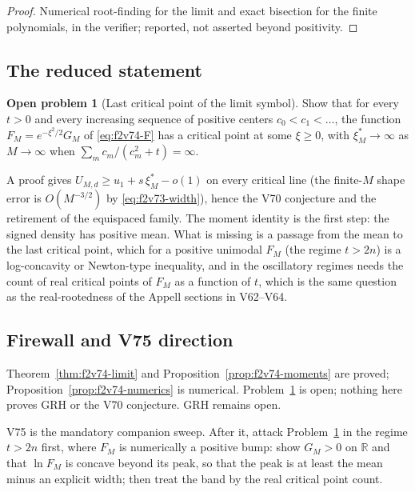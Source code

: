 \documentclass[11pt]{article}
\theoremstyle{definition}
\newtheorem{problem}[theorem]{Open problem}
\theoremstyle{remark}
\begin{document}
\begin{proof}
Numerical root-finding for the limit and exact bisection for the finite
polynomials, in the verifier; reported, not asserted beyond positivity.
\end{proof}

\subsection{The reduced statement}

\begin{problem}[Last critical point of the limit symbol]
\label{prob:f2v74-last}
Show that for every \(t>0\) and every increasing sequence of positive
centers \(c_0<c_1<\dots\), the function
\(F_M=e^{-\xi^2/2}G_M\) of \eqref{eq:f2v74-F} has a critical point at
some \(\xi\ge0\), with \(\xi^*_M\to\infty\) as \(M\to\infty\) when
\(\sum_m c_m/(c_m^2+t)=\infty\).
\end{problem}

A proof gives \(U_{M,d}\ge u_1+s\,\xi^*_M-o(1)\) on every critical line
(the finite-\(M\) shape error is \(O(M^{-3/2})\) by
\eqref{eq:f2v73-width}), hence the V70 conjecture and the retirement of
the equispaced family.  The moment identity is the first step: the
signed density has positive mean.  What is missing is a passage from
the mean to the last critical point, which for a positive unimodal
\(F_M\) (the regime \(t>2n\)) is a log-concavity or Newton-type
inequality, and in the oscillatory regimes needs the count of real
critical points of \(F_M\) as a function of \(t\), which is the same
question as the real-rootedness of the Appell sections in V62--V64.

\subsection*{Firewall and V75 direction}
\label{fire:f2v74}
Theorem~\ref{thm:f2v74-limit} and Proposition~\ref{prop:f2v74-moments}
are proved; Proposition~\ref{prop:f2v74-numerics} is numerical.
Problem~\ref{prob:f2v74-last} is open; nothing here proves GRH or the
V70 conjecture.  GRH remains open.

V75 is the mandatory companion sweep.  After it, attack
Problem~\ref{prob:f2v74-last} in the regime \(t>2n\) first, where
\(F_M\) is numerically a positive bump: show \(G_M>0\) on \(\mathbb R\)
and that \(\ln F_M\) is concave beyond its peak, so that the peak is at
least the mean minus an explicit width; then treat the band by the real
critical point count.
\end{document}
